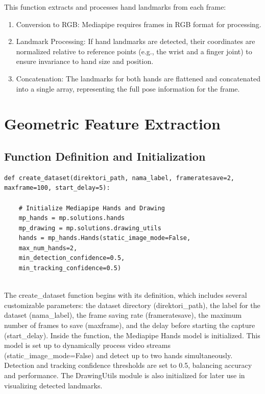 This function extracts and processes hand landmarks from each frame:
\begin{enumerate}
	\item Conversion to RGB: Mediapipe requires frames in RGB format for processing.
	\item Landmark Processing: If hand landmarks are detected, their coordinates are normalized relative to reference points (e.g., the wrist and a finger joint) to ensure invariance to hand size and position.
	\item Concatenation: The landmarks for both hands are flattened and concatenated into a single array, representing the full pose information for the frame.
\end{enumerate}

\section{Geometric Feature Extraction}

\subsection{Function Definition and Initialization}
\begin{lstlisting}
def create_dataset(direktori_path, nama_label, frameratesave=2, maxframe=100, start_delay=5):
	
	# Initialize Mediapipe Hands and Drawing
	mp_hands = mp.solutions.hands
	mp_drawing = mp.solutions.drawing_utils
	hands = mp_hands.Hands(static_image_mode=False,
	max_num_hands=2,
	min_detection_confidence=0.5,
	min_tracking_confidence=0.5)
	
\end{lstlisting}
The create\_dataset function begins with its definition, which includes several customizable parameters: the dataset directory (direktori\_path), the label for the dataset (nama\_label), the frame saving rate (frameratesave), the maximum number of frames to save (maxframe), and the delay before starting the capture (start\_delay). Inside the function, the Mediapipe Hands model is initialized. This model is set up to dynamically process video streams (static\_image\_mode=False) and detect up to two hands simultaneously. Detection and tracking confidence thresholds are set to 0.5, balancing accuracy and performance. The DrawingUtils module is also initialized for later use in visualizing detected landmarks.
